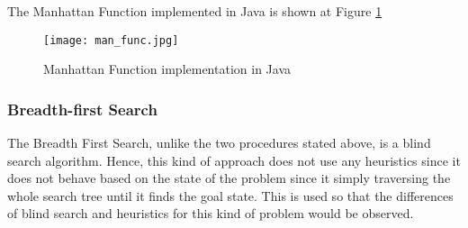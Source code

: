 			The Manhattan Function implemented in Java is shown at Figure \ref{fig:man}
			\begin{figure}[h]
			\centering
			\texttt{[image: man\_func.jpg]}
			\caption{Manhattan Function implementation in Java}
			\label{fig:man}
			\end{figure}

		\subsubsection{Breadth-first Search}
			The Breadth First Search, unlike the two procedures stated above, is a blind search algorithm. Hence, this kind of approach does not use any heuristics since it does not behave based on the state of the problem since it simply traversing the whole search tree until it finds the goal state. This is used so that the differences of blind search and heuristics for this kind of problem would be observed.

